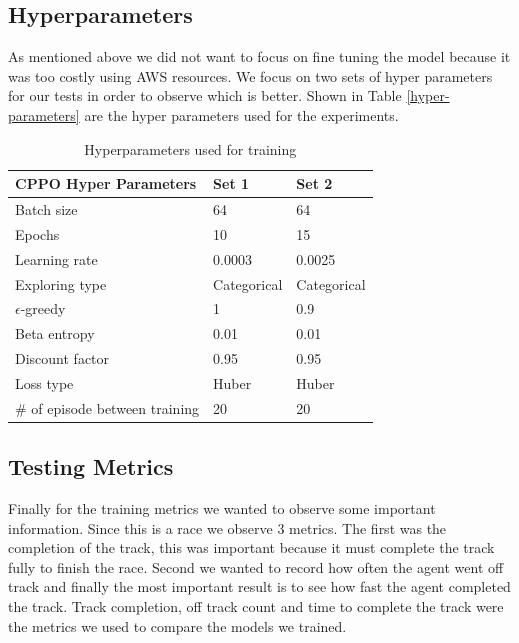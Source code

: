 \documentclass[journal]{IEEEtran}
\begin{document}
\subsection{Hyperparameters}
As mentioned above we did not want to focus on fine tuning the model because it was too costly using AWS resources. We focus on two sets of hyper parameters for our tests in order to observe which is better.  Shown in Table \ref{hyper-parameters} are the hyper parameters used for the experiments.

\begin{table}
\centering
\caption{Hyperparameters used for training}
\begin{tabular}{ | m{4cm} | m{4em}| m{4em} | } 
\hline
\textbf{CPPO Hyper Parameters} & \textbf{Set 1} & \textbf{Set 2} \\ 
\hline
Batch size & 64 & 64 \\ 
\hline
Epochs & 10 & 15 \\ 
\hline
Learning rate & 0.0003 & 0.0025 \\ 
\hline
Exploring type & Categorical & Categorical \\ 
\hline
$\epsilon$-greedy & 1 & 0.9 \\ 
\hline
Beta entropy & 0.01 & 0.01 \\ 
\hline
Discount factor & 0.95 & 0.95 \\ 
\hline
Loss type & Huber & Huber \\ 
\hline
\# of episode between training & 20 & 20 \\ 
\hline
\end{tabular}
\label{Hyperparameters}
\end{table}

\subsection{Testing Metrics}
Finally for the training metrics we wanted to observe some important information.  Since this is a race we observe 3 metrics.  The first was the completion of the track, this was important because it must complete the track fully to finish the race.  Second we wanted to record how often the agent went off track and finally the most important result is to see how fast the agent completed the track.  Track completion, off track count and time to complete the track were the metrics we used to compare the models we trained.
\end{document}
